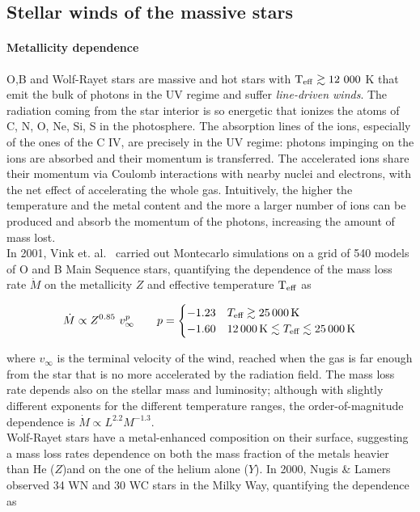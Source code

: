 \documentclass[a4paper,titlepage]{book}     	%
\newcommand{\mdot}{\ensuremath{\dot{M}}}
\begin{document}
\subsection{Stellar winds of the massive stars}\label{subsec:stellarwinds}
\paragraph{Metallicity dependence} O,B and Wolf-Rayet stars are massive and hot stars with $\rm T_{\rm eff} \gtrsim 12~000$ K that emit the bulk of photons in the UV regime and suffer \emph{line-driven winds}. The radiation coming from the star interior is so energetic that ionizes the atoms of C, N, O, Ne, Si, S in the photosphere. The absorption lines of the ions, especially of the ones of the C IV, are precisely in the UV regime: photons impinging on the ions are absorbed and their momentum is transferred. The accelerated ions share their momentum via Coulomb interactions with nearby nuclei and electrons, with the net effect of accelerating the whole gas. Intuitively, the higher the temperature and the metal content and the more a larger number of ions can be produced and absorb the momentum of the photons, increasing the amount of mass lost.\\

In 2001, Vink et. al.\ \cite{Vink2001} carried out Montecarlo simulations on a grid of 540 models of O and B Main Sequence stars, quantifying the dependence of the mass loss rate $\mdot$ on the metallicity $Z$ and effective temperature $\rm T_{\rm eff}$ as

\begin{equation}\label{eq:Vink2001}
\dot{M} \propto Z^{0.85}~v_\infty^p \quad \quad p = 
\begin{cases}
-1.23 & T_\textup{eff} \gtrsim \SI{25 000}{K} \\
-1.60 & \SI{12 000}{K} \lesssim T_\textup{eff} \lesssim \SI{25 000}{K}
\end{cases}
\end{equation}

where $v_\infty$ is the terminal velocity of the wind, reached when the gas is far enough from the star that is no more accelerated by the radiation field. The mass loss rate depends also on the stellar mass and luminosity; although with slightly different exponents for the different temperature ranges, the order-of-magnitude dependence is $\mdot \propto L^{2.2} M^{-1.3}$. \\

Wolf-Rayet stars have a metal-enhanced composition on their surface, suggesting a mass loss rates dependence on both the mass fraction of the metals heavier than He ($Z$)and on the one of the helium alone ($Y$). In 2000, Nugis \& Lamers \cite{Nugis2000_WRwinds} observed 34 WN and 30 WC stars in the Milky Way, quantifying the dependence as
\end{document}
